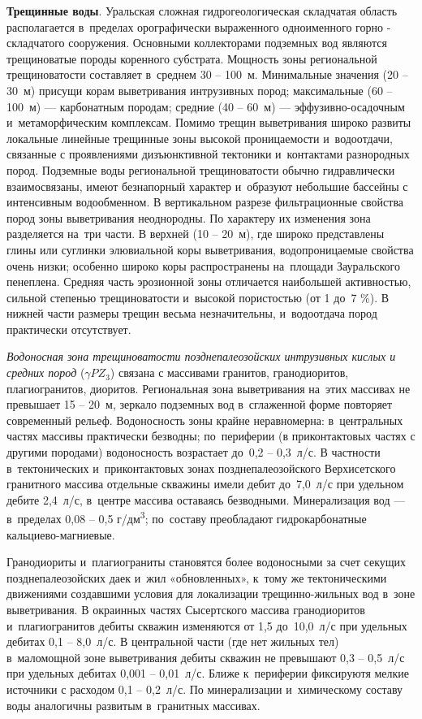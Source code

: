 \textbf{Трещинные воды}. Уральская сложная гидрогеологическая складчатая область располагается в~пределах орографически выраженного одноименного горно - складчатого сооружения. Основными коллекторами подземных вод являются трещиноватые породы коренного субстрата. Мощность зоны региональной трещиноватости составляет в~среднем 30  --  100~м. Минимальные значения (20  --  30~м) присущи корам выветривания интрузивных пород; максимальные (60  --  100~м)  ---  карбонатным породам; средние (40  --  60~м)  ---  эффузивно-осадочным и~метаморфическим комплексам. Помимо трещин выветривания широко развиты локальные линейные трещинные зоны высокой проницаемости и~водоотдачи, связанные с проявлениями дизъюнктивной тектоники и~контактами разнородных пород. Подземные воды региональной трещиноватости обычно гидравлически взаимосвязаны, имеют безнапорный характер и~образуют небольшие бассейны с интенсивным
водообменном. В вертикальном разрезе фильтрационные свойства пород зоны выветривания неоднородны. По характеру их изменения зона разделяется на~три части. В верхней (10  --  20~м), где широко представлены глины или суглинки элювиальной коры выветривания, водопроницаемые свойства очень низки; особенно широко коры распространены на~площади Зауральского пенеплена. Средняя часть эрозионной зоны отличается наибольшей активностью, сильной степенью трещиноватости и~высокой пористостью (от 1 до~7 \%). В нижней части размеры трещин весьма незначительны, и~водоотдача пород практически отсутствует.

\textit{Водоносная зона трещиноватости позднепалеозойских интрузивных кислых и средних пород} ($\gamma PZ_3$) связана с массивами гранитов, гранодиоритов, плагиогранитов, диоритов. Региональная зона выветривания на~этих массивах не превышает 15  --  20~м, зеркало подземных вод в~сглаженной форме повторяет современный рельеф. Водоносность зоны крайне неравномерна: в~центральных частях массивы практически безводны; по~периферии (в приконтактовых частях с другими породами) водоносность возрастает до~0,2  --  0,3~л/с. В частности в~тектонических и~приконтактовых зонах позднепалеозойского Верхисетского гранитного массива отдельные скважины имели дебит до~7,0~л/с при удельном дебите 2,4~л/с, в~центре массива оставаясь безводными. Минерализация вод  ---  в~пределах 0,08 -- 0,5 г/дм\textsuperscript{3}; по~составу преобладают гидрокарбонатные  кальциево-магниевые.

Гранодиориты и~плагиограниты становятся более водоносными за счет секущих позднепалеозойских даек и~жил «обновленных», к~тому же тектоническими движениями создавшими условия для локализации трещинно-жильных вод в~зоне выветривания. В окраинных частях Сысертского массива гранодиоритов и~плагиогранитов дебиты скважин изменяются от 1,5 до~10,0~л/с при удельных дебитах 0,1  --  8,0~л/с. В центральной части (где нет жильных тел) в~маломощной зоне выветривания дебиты скважин не превышают 0,3  --  0,5~л/с при удельных дебитах 0,001 -- 0,01~л/с. Ближе к~периферии фиксируютя мелкие источники с расходом 0,1  --  0,2~л/с. По минерализации и~химическому составу воды аналогичны развитым в~гранитных массивах. 

